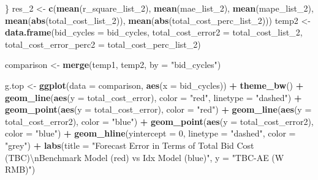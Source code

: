 \documentclass[]{article}
\newenvironment{Shaded}{\begin{snugshade}}{\end{snugshade}}
\newcommand{\KeywordTok}[1]{\textcolor[rgb]{0.13,0.29,0.53}{\textbf{#1}}}
\newcommand{\DataTypeTok}[1]{\textcolor[rgb]{0.13,0.29,0.53}{#1}}
\newcommand{\DecValTok}[1]{\textcolor[rgb]{0.00,0.00,0.81}{#1}}
\newcommand{\CharTok}[1]{\textcolor[rgb]{0.31,0.60,0.02}{#1}}
\newcommand{\StringTok}[1]{\textcolor[rgb]{0.31,0.60,0.02}{#1}}
\newcommand{\OperatorTok}[1]{\textcolor[rgb]{0.81,0.36,0.00}{\textbf{#1}}}
\newcommand{\NormalTok}[1]{#1}
\begin{document}
\begin{Shaded}
\begin{Highlighting}[]
\NormalTok{\}}
\NormalTok{res_}\DecValTok{2}\NormalTok{ <-}\StringTok{ }\KeywordTok{c}\NormalTok{(}\KeywordTok{mean}\NormalTok{(r_square_list_}\DecValTok{2}\NormalTok{), }\KeywordTok{mean}\NormalTok{(mae_list_}\DecValTok{2}\NormalTok{), }\KeywordTok{mean}\NormalTok{(mape_list_}\DecValTok{2}\NormalTok{), }
           \KeywordTok{mean}\NormalTok{(}\KeywordTok{abs}\NormalTok{(total_cost_list_}\DecValTok{2}\NormalTok{)), }\KeywordTok{mean}\NormalTok{(}\KeywordTok{abs}\NormalTok{(total_cost_perc_list_}\DecValTok{2}\NormalTok{)))}
\NormalTok{temp2 <-}\StringTok{ }\KeywordTok{data.frame}\NormalTok{(}\DataTypeTok{bid_cycles =}\NormalTok{ bid_cycles, }\DataTypeTok{total_cost_error2 =}\NormalTok{ total_cost_list_}\DecValTok{2}\NormalTok{, }
                    \DataTypeTok{total_cost_error_perc2 =}\NormalTok{ total_cost_perc_list_}\DecValTok{2}\NormalTok{)}

\NormalTok{comparison <-}\StringTok{ }\KeywordTok{merge}\NormalTok{(temp1, temp2, }\DataTypeTok{by =} \StringTok{"bid_cycles"}\NormalTok{)}

\NormalTok{g.top <-}\StringTok{ }\KeywordTok{ggplot}\NormalTok{(}\DataTypeTok{data =}\NormalTok{ comparison, }\KeywordTok{aes}\NormalTok{(}\DataTypeTok{x =}\NormalTok{ bid_cycles)) }\OperatorTok{+}
\StringTok{  }\KeywordTok{theme_bw}\NormalTok{() }\OperatorTok{+}
\StringTok{  }\KeywordTok{geom_line}\NormalTok{(}\KeywordTok{aes}\NormalTok{(}\DataTypeTok{y =}\NormalTok{ total_cost_error), }\DataTypeTok{color =} \StringTok{"red"}\NormalTok{, }\DataTypeTok{linetype =} \StringTok{"dashed"}\NormalTok{) }\OperatorTok{+}
\StringTok{  }\KeywordTok{geom_point}\NormalTok{(}\KeywordTok{aes}\NormalTok{(}\DataTypeTok{y =}\NormalTok{ total_cost_error), }\DataTypeTok{color =} \StringTok{"red"}\NormalTok{) }\OperatorTok{+}
\StringTok{  }\KeywordTok{geom_line}\NormalTok{(}\KeywordTok{aes}\NormalTok{(}\DataTypeTok{y =}\NormalTok{ total_cost_error2), }\DataTypeTok{color =} \StringTok{"blue"}\NormalTok{) }\OperatorTok{+}
\StringTok{  }\KeywordTok{geom_point}\NormalTok{(}\KeywordTok{aes}\NormalTok{(}\DataTypeTok{y =}\NormalTok{ total_cost_error2), }\DataTypeTok{color =} \StringTok{"blue"}\NormalTok{) }\OperatorTok{+}
\StringTok{  }\KeywordTok{geom_hline}\NormalTok{(}\DataTypeTok{yintercept =} \DecValTok{0}\NormalTok{, }\DataTypeTok{linetype =} \StringTok{"dashed"}\NormalTok{, }\DataTypeTok{color =} \StringTok{"grey"}\NormalTok{) }\OperatorTok{+}
\StringTok{  }\KeywordTok{labs}\NormalTok{(}\DataTypeTok{title =} \StringTok{"Forecast Error in Terms of Total Bid Cost (TBC)}\CharTok{\textbackslash{}n}\StringTok{Benchmark Model (red) vs Idx Model (blue)"}\NormalTok{, }\DataTypeTok{y =} \StringTok{"TBC-AE (W RMB)"}\NormalTok{)}


\end{Highlighting}
\end{Shaded}
\end{document}
